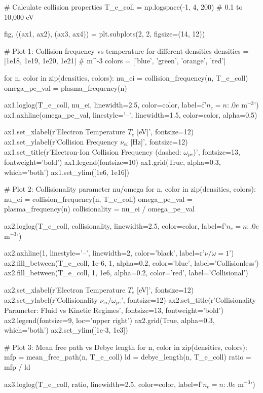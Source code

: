 \documentclass[11pt,a4paper]{article}
\begin{document}
\begin{pycode}
# Calculate collision properties
T_e_coll = np.logspace(-1, 4, 200)  # 0.1 to 10,000 eV

fig, ((ax1, ax2), (ax3, ax4)) = plt.subplots(2, 2, figsize=(14, 12))

# Plot 1: Collision frequency vs temperature for different densities
densities = [1e18, 1e19, 1e20, 1e21]  # m^-3
colors = ['blue', 'green', 'orange', 'red']

for n, color in zip(densities, colors):
    nu_ei = collision_frequency(n, T_e_coll)
    omega_pe_val = plasma_frequency(n)

    ax1.loglog(T_e_coll, nu_ei, linewidth=2.5, color=color,
              label=f'$n_e = {n:.0e}$ m$^{{-3}}$')
    ax1.axhline(omega_pe_val, linestyle='--', linewidth=1.5, color=color, alpha=0.5)

ax1.set_xlabel(r'Electron Temperature $T_e$ [eV]', fontsize=12)
ax1.set_ylabel(r'Collision Frequency $\nu_{ei}$ [Hz]', fontsize=12)
ax1.set_title(r'Electron-Ion Collision Frequency (dashed: $\omega_{pe}$)', fontsize=13, fontweight='bold')
ax1.legend(fontsize=10)
ax1.grid(True, alpha=0.3, which='both')
ax1.set_ylim([1e6, 1e16])

# Plot 2: Collisionality parameter nu/omega
for n, color in zip(densities, colors):
    nu_ei = collision_frequency(n, T_e_coll)
    omega_pe_val = plasma_frequency(n)
    collisionality = nu_ei / omega_pe_val

    ax2.loglog(T_e_coll, collisionality, linewidth=2.5, color=color,
              label=f'$n_e = {n:.0e}$ m$^{{-3}}$')

ax2.axhline(1, linestyle='--', linewidth=2, color='black', label=r'$\nu/\omega = 1$')
ax2.fill_between(T_e_coll, 1e-6, 1, alpha=0.2, color='blue', label='Collisionless')
ax2.fill_between(T_e_coll, 1, 1e6, alpha=0.2, color='red', label='Collisional')

ax2.set_xlabel(r'Electron Temperature $T_e$ [eV]', fontsize=12)
ax2.set_ylabel(r'Collisionality $\nu_{ei}/\omega_{pe}$', fontsize=12)
ax2.set_title(r'Collisionality Parameter: Fluid vs Kinetic Regimes', fontsize=13, fontweight='bold')
ax2.legend(fontsize=9, loc='upper right')
ax2.grid(True, alpha=0.3, which='both')
ax2.set_ylim([1e-3, 1e3])

# Plot 3: Mean free path vs Debye length
for n, color in zip(densities, colors):
    mfp = mean_free_path(n, T_e_coll)
    ld = debye_length(n, T_e_coll)
    ratio = mfp / ld

    ax3.loglog(T_e_coll, ratio, linewidth=2.5, color=color,
              label=f'$n_e = {n:.0e}$ m$^{{-3}}$')


\end{pycode}
\end{document}
